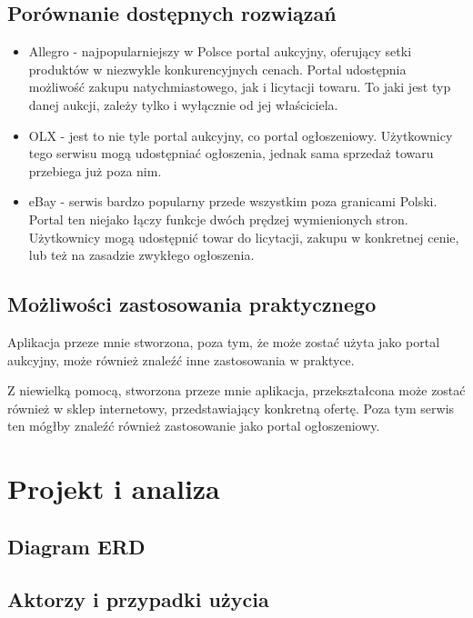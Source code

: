 \documentclass[brudnopis]{xmgr}
\begin{document}
\section{Porównanie dostępnych rozwiązań}

\begin{itemize}
\item Allegro - najpopularniejszy w Polsce portal aukcyjny, oferujący setki produktów w niezwykle
konkurencyjnych cenach. Portal udostępnia możliwość zakupu natychmiastowego, jak i licytacji
towaru. To jaki jest typ danej aukcji, zależy tylko i wyłącznie od jej właściciela.

\item OLX - jest to nie tyle portal aukcyjny, co portal ogłoszeniowy. Użytkownicy tego serwisu
mogą udostępniać ogłoszenia, jednak sama sprzedaż towaru przebiega już poza nim.

\item eBay - serwis bardzo popularny przede wszystkim poza granicami Polski. Portal ten niejako łączy
funkcje dwóch prędzej wymienionych stron. Użytkownicy mogą udostępnić towar do licytacji, zakupu 
w konkretnej cenie, lub też na zasadzie zwykłego ogłoszenia.
\end{itemize}


\section{Możliwości zastosowania praktycznego}
Aplikacja przeze mnie stworzona, poza tym, że może zostać użyta jako portal aukcyjny, może 
również znaleźć inne zastosowania w praktyce. 

Z niewielką pomocą, stworzona przeze mnie aplikacja, przekształcona może zostać również
w sklep internetowy, przedstawiający konkretną ofertę. Poza tym serwis ten mógłby znaleźć
również zastosowanie jako portal ogłoszeniowy. 

\chapter{Projekt i analiza}

\section{Diagram ERD}

\section{Aktorzy i przypadki użycia}
\end{document}
